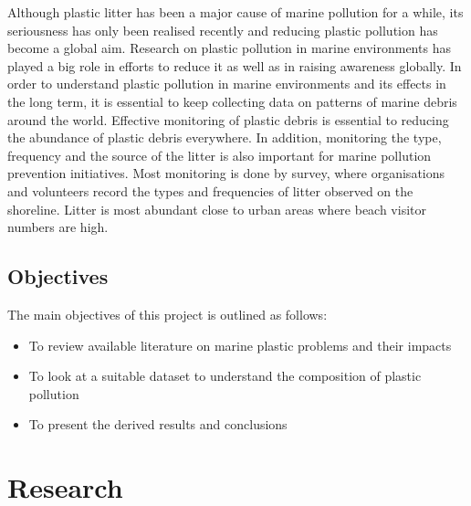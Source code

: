 \documentclass[10pt]{article}\usepackage[]{graphicx}\usepackage[]{color}
\begin{document}
Although plastic litter has been a major cause of marine pollution for a while, its seriousness has only been realised recently and reducing plastic pollution has become a global aim. Research on plastic pollution in marine environments has played a big role in efforts to reduce it as well as in raising awareness globally. In order to understand plastic pollution in marine environments and its effects in the long term, it is essential to keep collecting data on patterns of marine debris around the world. Effective monitoring of plastic debris is essential to reducing the abundance of plastic debris everywhere. In addition, monitoring the type, frequency and the source of the litter is also important for marine pollution prevention initiatives. Most monitoring is done by survey, where organisations and volunteers record the types and frequencies of litter observed on the shoreline.\cite{COE1997} Litter is most abundant close to urban areas where beach visitor numbers are high.\cite{GARRITY1993}


\subsection{Objectives }\label{obj}

The main objectives of this project is outlined as follows:
\begin{itemize}	
\item To review available literature on marine plastic problems and their impacts
\item	To look at a suitable dataset to understand the composition of plastic pollution 
\item	To present the derived results and conclusions 
\end{itemize}

























\pagebreak
\section{Research}\label{research}
\end{document}
